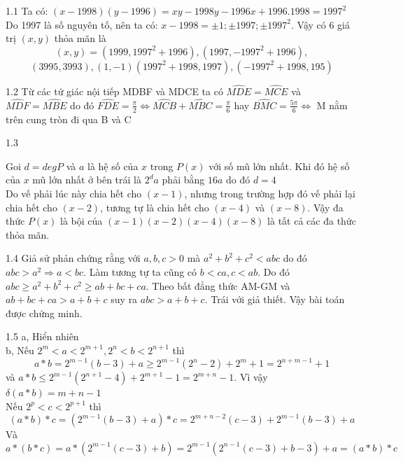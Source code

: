 \begin{Answer}{1.1}
Ta có: \quad $\left(x-1998\right)\left(y-1996\right)=xy-1998y-1996x+1996.1998=1997^2$\\
Do 1997 là số nguyên tố, nên ta có: $x - 1998 =  \pm 1; \pm 1997; \pm 1997^2 $. Vậy có 6 giá trị  $\left(x,y\right)$ thỏa mãn là $$ \left( {x,y} \right) = \left( {1999,1997^2  + 1996} \right),\left( {1997, - 1997^2  + 1996} \right), $$$$ \left( {3995,3993} \right),\left( {1, - 1} \right)\left( {1997^2  + 1998,1997} \right),\left( { - 1997^2  + 1998,195} \right) $$
\end{Answer}
\begin{Answer}{1.2}
Từ các tứ giác nội tiếp MDBF và MDCE ta có $\widehat{MDE} =\widehat{MCE} $ và $\widehat{MDF} =\widehat{MBE} $ do đó $\widehat{FDE} = \frac{\pi }{2} \Leftrightarrow \widehat{MCB} + \widehat{MBC} = \frac{\pi }{6}$ hay  $\widehat{BMC} = \frac{5\pi }{6}\Leftrightarrow$ M nằm trên cung tròn đi qua B và C
\end{Answer}
\begin{Answer}{1.3}

Goi $d=degP$ và $a$ là hệ số của $x$ trong $P(x)$ với số mũ lớn nhất. Khi đó hệ số của $x$ mũ lớn nhất ở bên trái là $2^d a$ phải bằng $16a$ do đó $d=4$\\
Do vế phải lúc này chia hết cho $(x-1)$, nhưng trong trường hợp đó vế phải lại chia hết cho $(x-2)$, tương tự là chia hết cho $(x-4)$ và $(x-8)$. Vậy đa thức $P(x)$ là bội của $(x-1)(x-2)(x-4)(x-8)$ là tất cả các đa thức thỏa mãn.
\end{Answer}
\begin{Answer}{1.4}
Giả sử phản chứng rằng với $a,b,c>0$ mà $a^2+b^2+c^2<abc$ do đó $abc>a^2 \Rightarrow a<bc$. Làm tương tự ta cũng có $b<ca, c<ab$. Do đó $abc\ge a^2+b^2+c^2\ge ab+bc+ca$. Theo bất đẳng thức AM-GM và $ab+bc+ca>a+b+c $ suy ra $abc>a+b+c$. Trái với giả thiết. Vậy bài toán được chứng minh.
\end{Answer}
\begin{Answer}{1.5}
\noindent
a, Hiển nhiên\\
b, Nếu $2^m  < a < 2^{m + 1}, 2^n  < b < 2^{n + 1}$  thì
$$ a * b = 2^{m - 1} \left( {b - 3} \right) + a \ge 2^{m - 1} \left( {2^n  - 2} \right) + 2^m  + 1 = 2^{n + m - 1}  + 1 $$
và $a * b \le 2^{m - 1} \left( {2^{n + 1}  - 4} \right) + 2^{m + 1}  - 1 = 2^{m + n}  - 1$. Vì vậy $\delta (a * b) = m + n - 1$\\
Nếu $2^p  < c < 2^{p + 1} $ thì \\$$\left( {a * b} \right) * c = \left( {2^{m - 1} \left( {b - 3} \right) + a} \right) * c = 2^{m + n - 2} \left( {c - 3} \right) + 2^{m - 1} (b - 3) + a$$
Và$$ a * \left( {b * c} \right) = a * \left( {2^{m - 1} \left( {c - 3} \right) + b} \right) = 2^{m - 1} \left( {2^{n - 1} (c - 3) + b - 3} \right) + a = \left( {a * b} \right) * c $$

\end{Answer}
